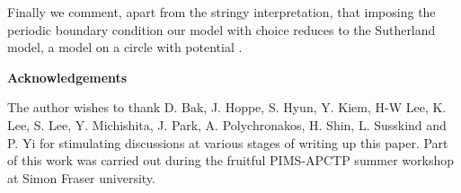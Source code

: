 \documentclass[a4paper,12pt]{article}
\begin{document}
Finally we comment, apart from the stringy interpretation, that imposing the periodic boundary condition our model
with  \coordHE{} choice reduces to the Sutherland model, a  model on a circle with \coordHE{} potential
\cite{Sutherland,PLB26629}.
\newline
\newline
\newline
\begin{center}
\large{\textbf{Acknowledgements}}
\end{center}
The author  wishes to thank D. Bak, J. Hoppe, S. Hyun,  Y. Kiem, H-W Lee, K. Lee,  S. Lee, Y. Michishita, J. Park, A. Polychronakos, 
H. Shin, L. Susskind and P. Yi for stimulating discussions at various stages of writing up this paper.  Part of
this work was carried out during the fruitful PIMS-APCTP summer workshop  at Simon Fraser university.
\newline
\newline
\newpage
\end{document}
